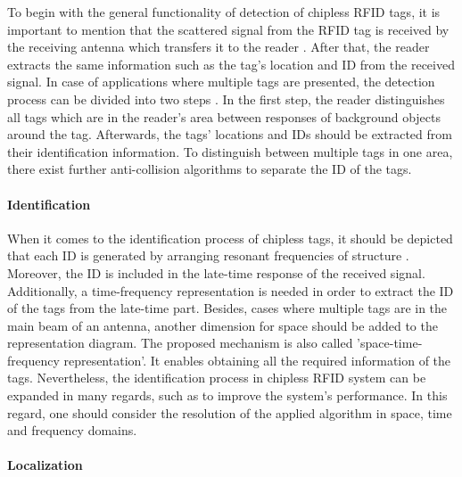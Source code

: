 To begin with the general functionality of detection of chipless RFID tags, it is important to mention that the scattered signal from the RFID tag is received by the receiving antenna which transfers it to the reader \cite[p.127 ff.]{chipless}. After that, the reader extracts the same information such as the tag's location and ID from the received signal. In case of applications where multiple tags are presented, the detection process can be divided into two steps \cite[p.127 ff.]{chipless}. In the first step, the reader distinguishes all tags which are in the reader's area between responses of background objects around the tag. Afterwards, the tags' locations and IDs should be extracted from their identification information. To distinguish between multiple tags in one area, there exist further anti-collision algorithms to separate the ID of the tags.

\paragraph{Identification}

When it comes to the identification process of chipless tags, it should be depicted that each ID is generated by arranging resonant frequencies of structure \cite[p.129]{chipless}. Moreover, the ID is included in the late-time response of the received signal. Additionally, a time-frequency representation is needed in order to extract the ID of the tags from the late-time part. Besides, cases where multiple tags are in the main beam of an antenna, another dimension for space should be added to the representation diagram. The proposed mechanism is also called 'space-time-frequency representation'. It enables obtaining all the required information of the tags. Nevertheless, the identification process in chipless RFID system can be expanded in many regards, such as to improve the system's performance. In this regard, one should consider the resolution of the applied algorithm in space, time and frequency domains.   

\paragraph{Localization}


